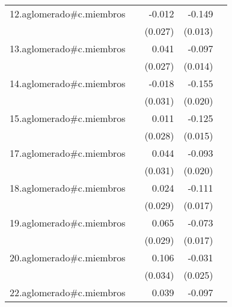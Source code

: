 {\begin{longtable}{l*{4}{D{.}{.}{-1}}}
\addlinespace
12.aglomerado#c.miembros&                     &      -0.012         &      -0.149\sym{***}&                     \\
            &                     &     (0.027)         &     (0.013)         &                     \\
\addlinespace
13.aglomerado#c.miembros&                     &       0.041         &      -0.097\sym{***}&                     \\
            &                     &     (0.027)         &     (0.014)         &                     \\
\addlinespace
14.aglomerado#c.miembros&                     &      -0.018         &      -0.155\sym{***}&                     \\
            &                     &     (0.031)         &     (0.020)         &                     \\
\addlinespace
15.aglomerado#c.miembros&                     &       0.011         &      -0.125\sym{***}&                     \\
            &                     &     (0.028)         &     (0.015)         &                     \\
\addlinespace
17.aglomerado#c.miembros&                     &       0.044         &      -0.093\sym{***}&                     \\
            &                     &     (0.031)         &     (0.020)         &                     \\
\addlinespace
18.aglomerado#c.miembros&                     &       0.024         &      -0.111\sym{***}&                     \\
            &                     &     (0.029)         &     (0.017)         &                     \\
\addlinespace
19.aglomerado#c.miembros&                     &       0.065\sym{*}  &      -0.073\sym{***}&                     \\
            &                     &     (0.029)         &     (0.017)         &                     \\
\addlinespace
20.aglomerado#c.miembros&                     &       0.106\sym{**} &      -0.031         &                     \\
            &                     &     (0.034)         &     (0.025)         &                     \\
\addlinespace
22.aglomerado#c.miembros&                     &       0.039         &      -0.097\sym{***}&                     \\

\end{longtable}}

